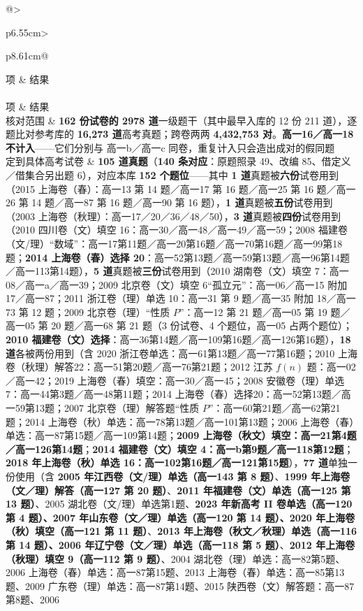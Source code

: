 \documentclass[a4paper,11pt]{article}
\begin{document}
\newcommand{\tabhdrA}{\rowcolor{white} 项 & 结果 \\}
\begin{xltabular}{\textwidth}{@{}>{\raggedright\arraybackslash}p{6.55cm}>{\raggedright\arraybackslash}p{8.61cm}@{}}
\toprule
\tabhdrA
\midrule
\endfirsthead
{} \\
\midrule
\tabhdrA
\midrule
\endhead
\bottomrule
\endlastfoot
核对范围 & \textbf{162 份试卷的 2978 道}一级题干（其中最早入库的 12 份 211 道），逐题比对参考库的 \textbf{16,273 道}高考真题；跨卷两两 \textbf{4,432,753 对}。\textbf{高一16／高一18 不计入}------它们分别与 高一b／高一c 同卷，重复计入只会造出成对的假同题 \\ \addlinespace[1pt]
定到具体高考试卷 & \textbf{105 道真题}（\textbf{140 条对应}：原题照录 49、改编 85、借定义／借集合另出题 6），对应本库 \textbf{152 个题位}------其中 \textbf{1 道}真题被\textbf{六份}试卷用到（2015 上海卷（春）：高一13 第 14 题／高一17 第 16 题／高一25 第 16 题／高一26 第 14 题／高一87 第 16 题／高一90 第 16 题），\textbf{1 道}真题被\textbf{五份}试卷用到（2003 上海卷（秋理）：高一17／20／36／48／50），\textbf{3 道}真题被\textbf{四份}试卷用到（2010 四川卷（文）填空 16：高一30／高一48／高一49／高一59；2008 福建卷（文/理）``数域''：高一17第11题／高一20第16题／高一70第16题／高一99第18题；\textbf{2014 上海卷（春）选择 20}：高一52第13题／高一59第13题／高一96第14题／高一113第14题），\textbf{5 道}真题被\textbf{三份}试卷用到（2010 湖南卷（文）填空 7：高一08／高一a／高一39；2009 北京卷（文）填空 6``孤立元''：高一06／高一15 附加 17／高一87；2011 浙江卷（理）单选 10：高一31 第 9 题／高一35 附加 18／高一73 第 12 题；2009 北京卷（理）``性质 \(P\)''：高一12 第 21 题／高一05 第 19 题／高一05 第 20 题／高一68 第 21 题（3 份试卷、4 个题位，高一05 占两个题位）；\textbf{2010 福建卷（文）选择}：高一36第14题／高一109第16题／高一126第16题），\textbf{18 道}各被两份用到（含 2020 浙江卷单选：高一61第13题／高一77第16题；2010 上海卷（秋理）解答22：高一51第20题／高一76第21题；2012 江苏 \(f(n)\) 题：高一02／高一42；2019 上海卷（春）填空：高一30／高一45；2008 安徽卷（理）单选7：高一44第3题／高一48第11题；2014 上海卷（春）选择20：高一52第13题／高一59第13题；2007 北京卷（理）解答题``性质 \(P\)''：高一60第21题／高一62第21题；2014 上海卷（秋）单选：高一78第13题／高一101第13题；2006 上海卷（春）单选：高一87第15题／高一109第14题；\textbf{2009 上海卷（秋文）填空：高一21第4题／高一126第14题}；\textbf{2014 福建卷（文）填空 4：高一b第9题／高一118第12题}；\textbf{2018 年上海卷（秋）单选 16：高一102第16题／高一121第15题}），\textbf{77 道}单独一份使用（含 \textbf{2005 年江西卷（文/理）单选（高一143 第 8 题）}、\textbf{1999 年上海卷（文／理）解答（高一127 第 20 题）}、\textbf{2011 年福建卷（文）单选（高一125 第 13 题）}、2005 湖北卷（文/理）单选第1题、\textbf{2023 年新高考 II 卷单选（高一120 第 4 题）、2007 年山东卷（文／理）单选（高一120 第 14 题）、2020 年上海卷（秋）填空（高一121 第 11 题）}、\textbf{2013 年上海卷（秋文／秋理）单选（高一116 第 14 题）、2006 年辽宁卷（文／理）单选（高一118 第 5 题）}、\textbf{2012 年上海卷（秋理）填空 9（高一112 第 9 题）}、2004 湖北卷（理）单选：高一82第5题、2006 上海卷（春）单选：高一87第15题、2013 上海卷（春）单选：高一85第13题、2009 广东卷（理）单选：高一87第14题、2015 陕西卷（文）解答题：高一87第8题、2006 
\end{xltabular}
\end{document}
